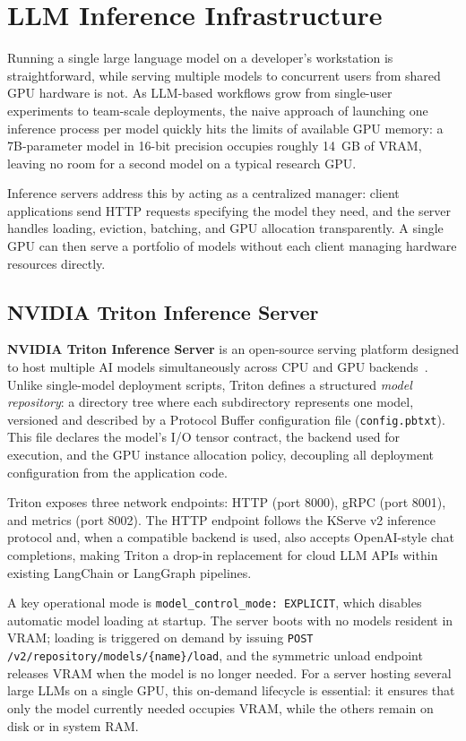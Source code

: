 \section{LLM Inference Infrastructure}
\label{sec:inference_infrastructure}

Running a single large language model on a developer's workstation is straightforward, while serving multiple models to concurrent users from shared GPU hardware is not. As LLM-based workflows grow from single-user experiments to team-scale deployments, the naive approach of launching one inference process per model quickly hits the limits of available GPU memory: a 7B-parameter model in 16-bit precision occupies roughly 14~GB of VRAM, leaving no room for a second model on a typical research GPU.

Inference servers address this by acting as a centralized manager: client applications send HTTP requests specifying the model they need, and the server handles loading, eviction, batching, and GPU allocation transparently. A single GPU can then serve a portfolio of models without each client managing hardware resources directly.

\subsection{NVIDIA Triton Inference Server}

\textbf{NVIDIA Triton Inference Server} is an open-source serving platform designed to host multiple AI models simultaneously across CPU and GPU backends~\cite{nvidia_triton_docs}. Unlike single-model deployment scripts, Triton defines a structured \textit{model repository}: a directory tree where each subdirectory represents one model, versioned and described by a Protocol Buffer configuration file (\texttt{config.pbtxt}). This file declares the model's I/O tensor contract, the backend used for execution, and the GPU instance allocation policy, decoupling all deployment configuration from the application code.

Triton exposes three network endpoints: HTTP (port 8000), gRPC (port 8001), and metrics (port 8002). The HTTP endpoint follows the KServe v2 inference protocol and, when a compatible backend is used, also accepts OpenAI-style chat completions, making Triton a drop-in replacement for cloud LLM APIs within existing LangChain or LangGraph pipelines.

A key operational mode is \texttt{model\_\allowbreak control\_\allowbreak mode:~EXPLICIT}, which disables automatic model loading at startup. The server boots with no models resident in VRAM; loading is triggered on demand by issuing \texttt{POST /v2/repository/\allowbreak{}models/\{name\}/load}, and the symmetric unload endpoint releases VRAM when the model is no longer needed. For a server hosting several large LLMs on a single GPU, this on-demand lifecycle is essential: it ensures that only the model currently needed occupies VRAM, while the others remain on disk or in system RAM.

